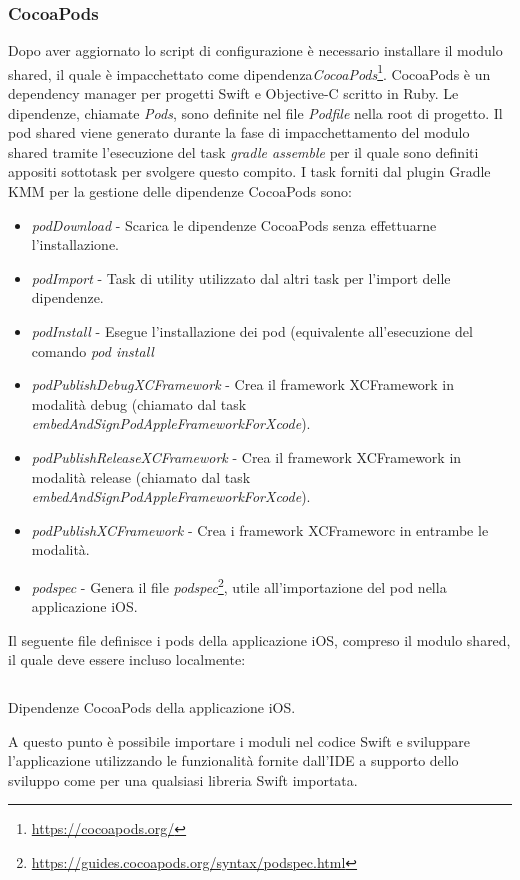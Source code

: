 \subsubsection{CocoaPods}
Dopo aver aggiornato lo script di configurazione è necessario installare il modulo shared, il quale è impacchettato come dipendenza\textit{CocoaPods}\footnote{\url{https://cocoapods.org/}}. CocoaPods è un dependency manager per progetti Swift e Objective-C scritto in Ruby. Le dipendenze, chiamate \textit{Pods}, sono definite nel file \textit{Podfile} nella root di progetto. Il pod shared viene generato durante la fase di impacchettamento del modulo shared tramite l'esecuzione del task \textit{gradle assemble} per il quale sono definiti appositi sottotask per svolgere questo compito. I task forniti dal plugin Gradle KMM per la gestione delle dipendenze CocoaPods sono:
\begin{itemize}
    \item \textit{podDownload} - Scarica le dipendenze CocoaPods senza effettuarne l'installazione.
    \item \textit{podImport} - Task di utility utilizzato dal altri task per l'import delle dipendenze.
    \item \textit{podInstall} - Esegue l'installazione dei pod (equivalente all'esecuzione del comando \textit{pod install}
    \item \textit{podPublishDebugXCFramework} - Crea il framework XCFramework in modalità debug (chiamato dal task \textit{embedAndSignPodAppleFrameworkForXcode}).
    \item \textit{podPublishReleaseXCFramework} - Crea il framework XCFramework in modalità release (chiamato dal task \textit{embedAndSignPodAppleFrameworkForXcode}).
    \item \textit{podPublishXCFramework} - Crea i framework XCFrameworc in entrambe le modalità.
    \item \textit{podspec} - Genera il file \textit{podspec}\footnote{\url{https://guides.cocoapods.org/syntax/podspec.html}}, utile all'importazione del pod nella applicazione iOS.
\end{itemize}

Il seguente file definisce i pods della applicazione iOS, compreso il modulo shared, il quale deve essere incluso localmente:

\begin{listing}[H]
\inputminted{bash}{code/5-podfile}
\caption{Dipendenze CocoaPods della applicazione iOS.}
\end{listing}
A questo punto è possibile importare i moduli nel codice Swift e sviluppare l'applicazione utilizzando le funzionalità fornite dall'IDE a supporto dello sviluppo come per una qualsiasi libreria Swift importata.

